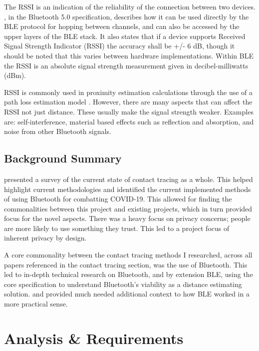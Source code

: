 \documentclass{l4proj}
\begin{document}
The RSSI is an indication of the reliability of the connection between two devices. \citet{SIG5.0}, in the Bluetooth 5.0 specification, describes how it can be used directly by the BLE protocol for hopping between channels, and can also be accessed by the upper layers of the BLE stack. It also states that if a device supports Received Signal Strength Indicator (RSSI) the accuracy shall be +/- 6 dB, though it should be noted that this varies between hardware implementations. Within BLE the RSSI is an absolute signal strength measurement given in decibel-milliwatts (dBm).

RSSI is commonly used in proximity estimation calculations through the use of a path loss estimation model \citep{ahmed_survey_2020}. However, there are many aspects that can affect the RSSI not just distance. These usually make the signal strength weaker. Examples are: self-interference, material based effects such as reflection and absorption, and noise from other Bluetooth signals.

\section{Background Summary}

\citet{ahmed_survey_2020} presented a survey of the current state of contact tracing as a whole. This helped highlight current methodologies and identified the current implemented methods of using Bluetooth for combatting COVID-19. This allowed for finding the commonalities between this project and existing projects, which in turn provided focus for the novel aspects. There was a heavy focus on privacy concerns; people are more likely to use something they trust. This led to a project focus of inherent privacy by design.

A core commonality between the contact tracing methods I researched, across all papers referenced in the contact tracing section, was the use of Bluetooth. This led to in-depth technical research on Bluetooth, and by extension BLE, using the core specification \citep{SIG5.0} to understand Bluetooth's viability as a distance estimating solution. \citet{gomez_overview_2012} and \citet{yang_beyond_2020} provided much needed additional context to how BLE worked in a more practical sense.

\chapter{Analysis \& Requirements}
\end{document}
